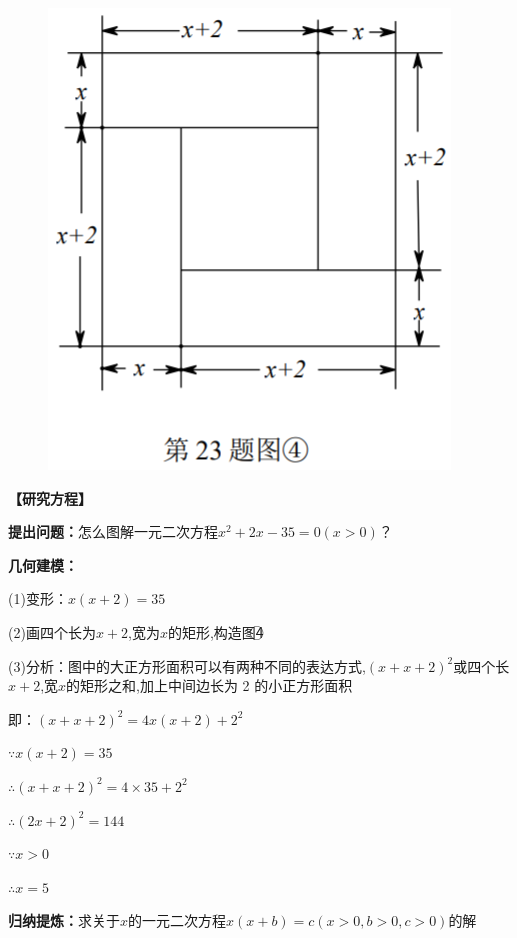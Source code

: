\documentclass[10pt,a4paper]{ctexart}
\begin{document}
	\begin{figure}
			\includegraphics[width=\linewidth]{23/2013c}
	\end{figure}
	
	\textbf{【研究方程】}
	
	\textbf{提出问题：}怎么图解一元二次方程$x^2+2x-35=0(x>0)$？
	
	\textbf{几何建模：}
	
	(1)变形：$ x(x+2)=35 $
	
	(2)画四个长为$ x+2 $,宽为$ x $的矩形,构造图\textcircled{4}
	
	(3)分析：图中的大正方形面积可以有两种不同的表达方式,$ (x+x+2)^2 $或四个长$ x+2 $,宽$ x $的矩形之和,加上中间边长为 2 的小正方形面积
	
	即：$(x+x+2)^2=4x(x+2)+2^2$
	
	$\because x(x+2)=35$
	
	$\therefore (x+x+2)^2=4\times35+2^2$
	
	$\therefore (2x+2)^2=144$
	
	$\because x>0$
	
	$\therefore x=5$
	
	\textbf{归纳提炼：}求关于$ x $的一元二次方程$ x(x+b)=c(x>0,b>0,c>0) $的解
	
\end{document}
